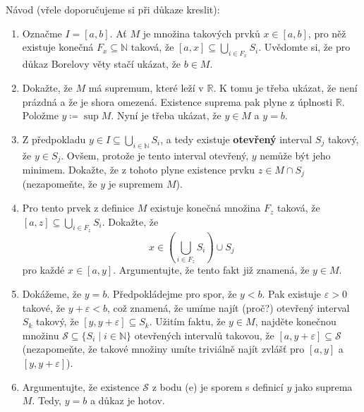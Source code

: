 \documentclass[a4paper,11pt]{article}
\newcommand{\R}{\mathbb{R}}
\newcommand{\N}{\mathbb{N}}
\begin{document}
\begin{tcolorbox}[breakable,title=\textsf{Těžké úlohy a důkazy (12
  bodů)},arc=0mm,boxsep=3mm,bottomrule=1pt,toprule=1pt,leftrule=-0.1mm,
  rightrule=-0.1mm,colframe=BrickRed!80!white,colback=BrickRed!5!white]
\begin{enumerate}
   Návod (vřele doporučujeme si při důkaze kreslit):
   \begin{enumerate}
    \item Označme $I = [a,b]$. Ať $M$ je množina takových prvků $x \in [a,b]$,
     pro něž existuje konečná $F_x \subseteq \N$ taková, že $[a,x] \subseteq
     \bigcup_{i \in F_x} S_i$. Uvědomte si, že pro důkaz Borelovy věty stačí
     ukázat, že $b \in M$.
    \item Dokažte, že $M$ má supremum, které leží v $\R$. K tomu je třeba
     ukázat, že není prázdná a že je shora omezená. Existence suprema pak plyne
     z úplnosti $\R$. Položme $y \coloneqq \sup M$. Nyní je třeba ukázat, že
     $y \in M$ a $y = b$.
    \item Z předpokladu $y \in I \subseteq \bigcup_{i \in \N} S_i$, a tedy
     existuje \textbf{otevřený} interval $S_j$ takový, že $y \in S_j$. Ovšem,
     protože je tento interval otevřený, $y$ nemůže být jeho mi\-nimem. Dokažte,
     že z tohoto plyne existence prvku $z \in M \cap S_j$ (nezapomeňte, že $y$
     je supremem $M$).
    \item Pro tento prvek z definice $M$ existuje konečná množina $F_z$ taková,
     že $[a,z] \subseteq \bigcup_{i \in F_z} S_i$. Dokažte, že
     \[
      x \in \left( \bigcup_{i \in F_z} S_i \right) \cup S_j
     \]
     pro každé $x \in [a,y]$. Argumentujte, že tento fakt již znamená, že $y \in
     M$.
    \item Dokážeme, že $y = b$. Předpokládejme pro spor, že $y < b$. Pak
     existuje $\varepsilon>0$ takové, že $y + \varepsilon < b$, což znamená, že
     umíme najít (proč?) otevřený interval $S_k$ takový, že $[y,y+\varepsilon]
     \subseteq S_k$. Užitím faktu, že $y \in M$, najděte konečnou množinu
     $\mathcal{S} \subseteq \{S_i \mid i \in \N\}$ otevřených intervalů takovou,
     že $[a,y + \varepsilon] \subseteq \mathcal{S}$ (nezapomeňte, že takové
     množiny umíte triviálně najít zvlášť pro $[a,y]$ a $[y,y+\varepsilon]$).
    \item Argumentujte, že existence $\mathcal{S}$ z bodu (e) je sporem s
     definicí $y$ jako suprema $M$. Tedy, $y = b$ a důkaz je hotov.
   \end{enumerate}
  \end{enumerate}
 \end{tcolorbox}
\end{document}

